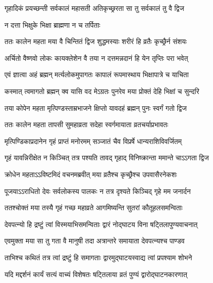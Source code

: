 \twolineshloka
{गृहादिकं प्रयच्छन्ती सर्वकालं महासती}
{अतिकृच्छ्ररता सा तु सर्वकालं तु वै द्विज}%

\onelineshloka
{न दत्ता भिक्षुके भिक्षा ब्राह्मणा न च तर्पिताः}%

\twolineshloka
{ततः कालेन महता मया वै चिन्तितं द्विज}
{शुद्धमस्याः शरीरं हि व्रतैः कृच्छ्रैर्न संशयः}%

\twolineshloka
{अर्चितो वैष्णवो लोकः कायक्लेशेन  वै तया}
{न दत्तमन्नदानं हि येन तृप्तिः परा भवेत्}%

\twolineshloka
{एवं ज्ञात्वा अहं ब्रह्मन् मर्त्यलोकमुपागतः}
{कापालं रूपमास्थाय भिक्षापात्रे च याचिता}%

\twolineshloka
{कस्मात् त्वमागतो ब्रह्मन् क्व यासि वद मेऽग्रतः}
{पुनरेव मया प्रोक्तं देहि भिक्षां च सुन्दरि}%

\twolineshloka
{तया कोपेन महता मृत्पिण्डस्ताम्रभाजने}
{क्षिप्तो यावदहं ब्रह्मन् पुनः स्वर्गं गतो द्विज}%

\twolineshloka
{ततः कालेन महता तापसी सुमहाव्रता}
{सदेहा स्वर्गमायाता व्रतचर्याप्रभावतः}%

\twolineshloka
{मृत्पिण्डिकाप्रदानेन गृहं प्राप्तं मनोरमम्}
{सञ्जातं चैव विप्रर्षे धान्यराशिविवर्जितम्}%

\twolineshloka
{गृहं यावन्निरीक्षेत न किञ्चित् तत्र पश्यति}
{तावद् गृहाद् विनिष्क्रान्ता ममान्ते चाऽऽगता द्विज}%

\twolineshloka
{क्रोधेन महताऽऽविष्टमिदं वचनमब्रवीत्}
{मया व्रतैश्च कृच्छ्रैश्च उपवासैरनेकशः}%

\twolineshloka
{पूजयाऽऽराधितो देवः सर्वलोकस्य पालकः}
{न तत्र  दृश्यते किञ्चिद् गृहे मम जनार्दन}%

\twolineshloka
{ततश्चोक्तं मया तस्यै गृहं गच्छ महाव्रते}
{आगमिष्यन्ति सुतरां कौतूहलसमन्विताः}%

\twolineshloka
{देवपत्न्यो हि द्रष्टुं त्वां विस्मयाभिसमन्विताः}
{द्वारं नोद्घाटय विना षट्तिलापुण्यवाचनात्}%

\twolineshloka
{एवमुक्ता मया सा तु गता वै मानुषी तदा}
{अत्रान्तरे समायाता देवपत्न्यश्च पाण्डव}%

\twolineshloka
{ताभिश्च कथितं तत्र त्वां द्रष्टुं हि समागताः}
{द्वारमुद्घाटयस्वाद्य त्वां प्रपश्याम शोभने}%


\twolineshloka
{यदि मद्दर्शनं कार्यं सत्यं वाच्यं विशेषतः}
{षट्तिलाया व्रतं पुण्यं द्वारोद्घाटनकारणात्}%


